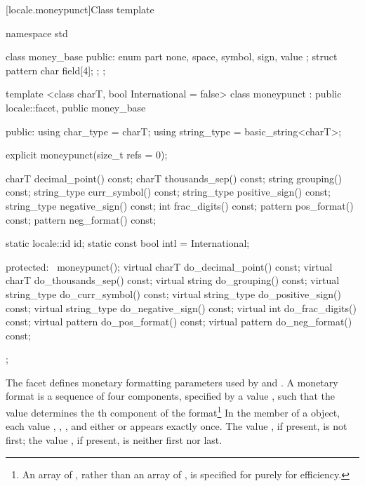 [locale.moneypunct]{Class template }

%
\begin{codeblock}
namespace std {
  class money_base {
  public:
    enum part { none, space, symbol, sign, value };
    struct pattern { char field[4]; };
  };

  template <class charT, bool International = false>
  class moneypunct : public locale::facet, public money_base {
  public:
    using char_type   = charT;
    using string_type = basic_string<charT>;

    explicit moneypunct(size_t refs = 0);

    charT        decimal_point() const;
    charT        thousands_sep() const;
    string       grouping()      const;
    string_type  curr_symbol()   const;
    string_type  positive_sign() const;
    string_type  negative_sign() const;
    int          frac_digits()   const;
    pattern      pos_format()    const;
    pattern      neg_format()    const;

    static locale::id id;
    static const bool intl = International;

  protected:
    ~moneypunct();
    virtual charT        do_decimal_point() const;
    virtual charT        do_thousands_sep() const;
    virtual string       do_grouping()      const;
    virtual string_type  do_curr_symbol()   const;
    virtual string_type  do_positive_sign() const;
    virtual string_type  do_negative_sign() const;
    virtual int          do_frac_digits()   const;
    virtual pattern      do_pos_format()    const;
    virtual pattern      do_neg_format()    const;
  };
}
\end{codeblock}

\pnum
The
facet defines monetary formatting parameters used by
and
.
A monetary format is a sequence of four components,
specified by a
value
,
such that the
value
determines the
th
component of the format\footnote{An array of
,
rather than an array of
,
is specified for
purely for efficiency.}
In the
member of a
object, each value
,
,
,
and either
or
appears exactly once.
The value
,
if present, is not first;
the value
,
if present, is neither first nor last.

